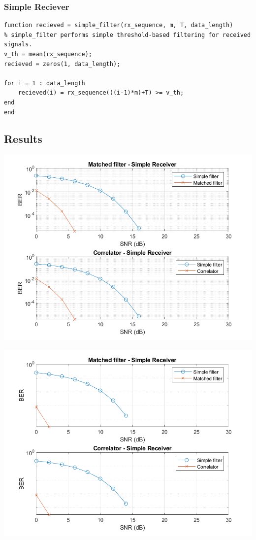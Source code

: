 \documentclass[a4paper, 12pt, english]{article}
\newenvironment{Figure}
  {\par\medskip\noindent\minipage{\linewidth}}
  {\endminipage\par\medskip}
\begin{document}
\subsubsection{Simple Reciever}
\begin{lstlisting}[style=matlab]
function recieved = simple_filter(rx_sequence, m, T, data_length)
% simple_filter performs simple threshold-based filtering for received signals.
v_th = mean(rx_sequence);
recieved = zeros(1, data_length);

for i = 1 : data_length
    recieved(i) = rx_sequence(((i-1)*m)+T) >= v_th;
end
end
\end{lstlisting}

\subsection{Results}
\begin{Figure}
 \centering
 \includegraphics[width=\linewidth, scale=0.5]{figures/performance-of-matched-filters-and-correlators/BER10samples.png}
\end{Figure}
\begin{Figure}
 \centering
 \includegraphics[width=\linewidth, scale=0.5]{figures/performance-of-matched-filters-and-correlators/BER20samples.png}
\end{Figure}
\end{document}
